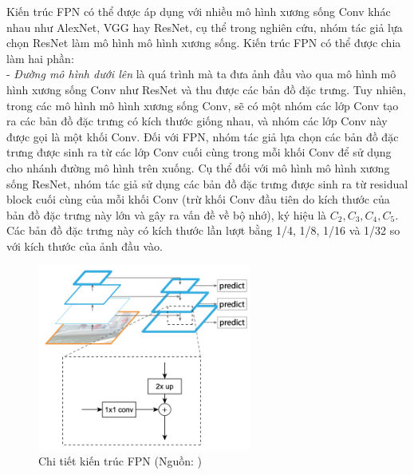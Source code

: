 {    \noindent
    Kiến trúc FPN có thể được áp dụng với nhiều mô hình xương sống Conv khác nhau như AlexNet, VGG hay ResNet, cụ thể trong nghiên cứu, nhóm tác giả lựa chọn ResNet làm mô hình mô hình xương sống.
    Kiến trúc FPN có thể được chia làm hai phần: \\
    - \textit{Đường mô hình dưới lên} là quá trình mà ta đưa ảnh đầu vào qua mô hình mô hình xương sống Conv như ResNet và thu được các bản đồ đặc trưng.
    Tuy nhiên, trong các mô hình mô hình xương sống Conv, sẽ có một nhóm các lớp Conv tạo ra các bản đồ đặc trưng có kích thước giống nhau, và nhóm các lớp Conv này được gọi là một khối Conv.
    Đối với FPN, nhóm tác giả lựa chọn các bản đồ đặc trưng được sinh ra từ các lớp Conv cuối cùng trong mỗi khối Conv để sử dụng cho nhánh đường mô hình trên xuống.
    Cụ thể đối với mô hình mô hình xương sống ResNet, nhóm tác giả sử dụng các bản đồ đặc trưng được sinh ra từ residual block cuối cùng của mỗi khối Conv (trừ khối Conv đầu tiên do kích thước của bản đồ đặc trưng này lớn và gây ra vấn đề về bộ nhớ), ký hiệu là \textit{{${C}_{2}, {C}_{3}, {C}_{4}, {C}_{5}$}}.
    Các bản đồ đặc trưng này có kích thước lần lượt bằng 1/4, 1/8, 1/16 và 1/32 so với kích thước của ảnh đầu vào.

    \begin{figure}[H]
        \centering
        \includegraphics[width=7cm] {images/fpn_detail}
        \caption{Chi tiết kiến trúc FPN (Nguồn: \cite{lin2017feature})}
        \label{fig:fpn_detail}
    \end{figure}

}
